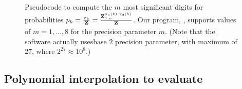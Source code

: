 \begin{figure}[!h]
\begin{small}
\end{small}
\caption{\small
Pseudocode to compute the $m$ most significant digits
for probabilities
$p_k = \frac{z_{k}}{{\bf Z}^{}_{}}=\frac{{\bf Z}^{\pi_1(k),\pi_2(k)}_{1,n}}{{\bf Z}^{}_{}}$.
Our program, \ffttwo, supports values of $m = 1,\dots,8$ for the
precision parameter $m$.
(Note that the software actually usesbase $2$ precision parameter, with maximum of $27$, where $2^{27} \approx
10^8$.)
}
\label{pseudocode:interpolatingP}
\end{figure}

\subsection{Polynomial interpolation to evaluate
\texorpdfstring{}{}}
\label{subsec:ffttwo:fft}

